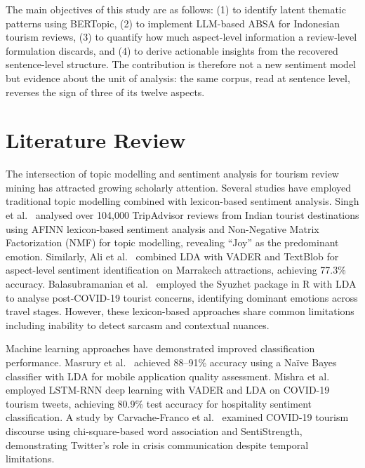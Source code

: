 \documentclass[pdflatex,sn-mathphys-num]{sn-jnl}
\begin{document}
The main objectives of this study are as follows: (1) to identify latent thematic patterns using BERTopic, (2) to implement LLM-based ABSA for Indonesian tourism reviews, (3) to quantify how much aspect-level information a review-level formulation discards, and (4) to derive actionable insights from the recovered sentence-level structure. The contribution is therefore not a new sentiment model but evidence about the unit of analysis: the same corpus, read at sentence level, reverses the sign of three of its twelve aspects.

\section{Literature Review}\label{sec2}

The intersection of topic modelling and sentiment analysis for tourism review mining has attracted growing scholarly attention. Several studies have employed traditional topic modelling combined with lexicon-based sentiment analysis. Singh et al.\ \cite{bib6} analysed over 104,000 TripAdvisor reviews from Indian tourist destinations using AFINN lexicon-based sentiment analysis and Non-Negative Matrix Factorization (NMF) for topic modelling, revealing ``Joy'' as the predominant emotion. Similarly, Ali et al.\ \cite{bib7} combined LDA with VADER and TextBlob for aspect-level sentiment identification on Marrakech attractions, achieving 77.3\% accuracy. Balasubramanian et al.\ \cite{bib8} employed the Syuzhet package in R with LDA to analyse post-COVID-19 tourist concerns, identifying dominant emotions across travel stages. However, these lexicon-based approaches share common limitations including inability to detect sarcasm and contextual nuances.

Machine learning approaches have demonstrated improved classification performance. Masrury et al.\ \cite{bib9} achieved 88--91\% accuracy using a Na\"ive Bayes classifier with LDA for mobile application quality assessment. Mishra et al.\ \cite{bib10} employed LSTM-RNN deep learning with VADER and LDA on COVID-19 tourism tweets, achieving 80.9\% test accuracy for hospitality sentiment classification. A study by Carvache-Franco et al.\ \cite{bib11} examined COVID-19 tourism discourse using chi-square-based word association and SentiStrength, demonstrating Twitter's role in crisis communication despite temporal limitations.
\end{document}
